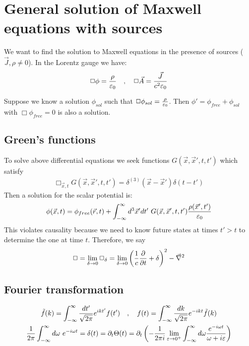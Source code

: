 \section{General solution of Maxwell equations with sources}

We want to find the solution to Maxwell equations in the presence of sources
($\vec{J},\rho \neq 0$). In the Lorentz gauge we have:
\begin{align*}
    \Box \phi = \frac{\rho}{\varepsilon_0}
    \hspace{10pt} , \hspace{10pt}
    \Box \vec{A} = \frac{\vec{J}}{c^2 \varepsilon_0}
\end{align*}

Suppose we know a solution $\phi_{sol}$ such that $\Box \phi_{sol} =
\frac{\rho}{\varepsilon_0}$. Then $\phi' = \phi_{free} + \phi_{sol}$ with
$\Box \phi_{free} = 0$ is also a solution. 

\subsection{Green's functions}

To solve above differential equations we seek functions $G(\vec{x},\vec{x}',t,t')$
which satisfy
\begin{align*}
    \Box_{\vec{x},t} G(\vec{x},\vec{x}',t,t') = \delta^{(3)}(\vec{x}-\vec{x}') \delta(t-t')
\end{align*}
Then a solution for the scalar potential is:
\begin{align*}
    \phi(\vec{x},t) = \phi_{free}(\vec{r},t) +
        \int_{-\infty}^\infty d^3 \vec{x}' d t' \ G(\vec{x},\vec{x}',t,t') \frac{\rho(\vec{x}',t')}{\varepsilon_0}
\end{align*}
This violates causality because we need to know future states at times $t' > t$
to determine the one at time $t$. Therefore, we say
\begin{align*}
    \Box = \lim\limits_{\delta \rightarrow 0} \Box_\delta
    = \lim\limits_{\delta \rightarrow 0} \left( \frac{1}{c} \frac{\partial}{\partial t} + \delta \right)^2 - \vec{\nabla}^2
\end{align*}

\subsection{Fourier transformation}

\begin{align*}
    \tilde{f}(k) = \int_{-\infty}^\infty \frac{dt'}{\sqrt{2 \pi}} e^{i k t'} f(t')
    \hspace{10pt} &, \hspace{10pt}
    f(t) = \int_{-\infty}^\infty \frac{dk}{\sqrt{2 \pi}} e^{-i k t} \tilde{f}(k)
    \\
    \frac{1}{2 \pi} \int_{-\infty}^\infty d \omega \ e^{-i \omega t} = \delta(t)
    = \partial_t \Theta(t) &= \partial_t \left( - \frac{1}{2 \pi i}
    \lim\limits_{\varepsilon \rightarrow 0^+} \int_{-\infty}^\infty d \omega \frac{e^{-i \omega t}}{\omega + i \varepsilon} \right)
\end{align*}

